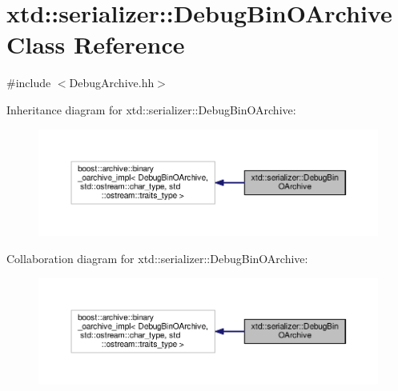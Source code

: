 \hypertarget{classxtd_1_1serializer_1_1DebugBinOArchive}{\section{xtd\-:\-:serializer\-:\-:Debug\-Bin\-O\-Archive Class Reference}
\label{classxtd_1_1serializer_1_1DebugBinOArchive}
}


{\ttfamily \#include $<$Debug\-Archive.\-hh$>$}



Inheritance diagram for xtd\-:\-:serializer\-:\-:Debug\-Bin\-O\-Archive\-:
\nopagebreak
\begin{figure}[H]
\begin{center}
\leavevmode
\includegraphics[width=350pt]{classxtd_1_1serializer_1_1DebugBinOArchive__inherit__graph}
\end{center}
\end{figure}


Collaboration diagram for xtd\-:\-:serializer\-:\-:Debug\-Bin\-O\-Archive\-:
\nopagebreak
\begin{figure}[H]
\begin{center}
\leavevmode
\includegraphics[width=350pt]{classxtd_1_1serializer_1_1DebugBinOArchive__coll__graph}
\end{center}
\end{figure}

